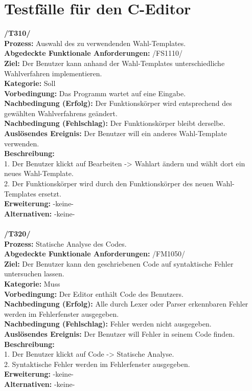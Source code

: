 \documentclass[a4paper]{scrreprt}
\begin{document}
\section{Testfälle für den C-Editor}
\textbf{/T310/} \\
\textbf{Prozess:} Auswahl des zu verwendenden Wahl-Templates. \\
\textbf{Abgedeckte Funktionale Anforderungen:} /FS1110/ \\
\textbf{Ziel:} Der Benutzer kann anhand der Wahl-Templates unterschiedliche Wahlverfahren implementieren. \\
\textbf{Kategorie:} Soll \\
\textbf{Vorbedingung:} Das Programm wartet auf eine Eingabe.\\
\textbf{Nachbedingung (Erfolg):} Der Funktionskörper wird entsprechend des gewählten Wahlverfahrens geändert. \\
\textbf{Nachbedingung (Fehlschlag):} Der Funktionskörper bleibt derselbe. \\
\textbf{Auslösendes Ereignis:} Der Benutzer will ein anderes Wahl-Template verwenden. \\
\textbf{Beschreibung:} \\
1. Der Benutzer klickt auf Bearbeiten -> Wahlart ändern und wählt dort ein neues Wahl-Template. \\
2. Der Funktionskörper wird durch den Funktionskörper des neuen Wahl-Templates ersetzt. \\
\textbf {Erweiterung:} -keine- \\
\textbf {Alternativen:} -keine- \\
\\
\textbf{/T320/} \\
\textbf{Prozess:} Statische Analyse des Codes. \\
\textbf{Abgedeckte Funktionale Anforderungen:} /FM1050/ \\
\textbf{Ziel:} Der Benutzer kann den geschriebenen Code auf syntaktische Fehler untersuchen lassen. \\
\textbf{Kategorie:} Muss \\
\textbf{Vorbedingung:} Der Editor enthält Code des Benutzers. \\
\textbf{Nachbedingung (Erfolg):} Alle durch Lexer oder Parser erkennbaren Fehler werden im Fehlerfenster ausgegeben. \\
\textbf{Nachbedingung (Fehlschlag):} Fehler werden nicht ausgegeben. \\
\textbf{Auslösendes Ereignis:} Der Benutzer will Fehler in seinem Code finden. \\
\textbf{Beschreibung:} \\
1. Der Benutzer klickt auf Code -> Statische Analyse. \\
2. Syntaktische Fehler werden im Fehlerfenster ausgegeben. \\
\textbf {Erweiterung:} -keine- \\
\textbf {Alternativen:} -keine- \\
\end{document}
